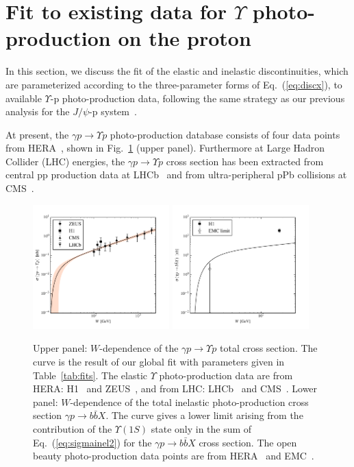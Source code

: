 \documentclass[prd,amsmath,%
twocolumn,floatfix,amssymb, preprintnumbers, linenumbers,nofootinbib, superscriptaddress]{revtex4}
\begin{document}
\section{Fit to existing data for $\Upsilon$ photo-production on the proton}


In this section, we discuss the fit of the elastic and inelastic discontinuities, which are parameterized according to the three-parameter forms of Eq.~(\ref{eq:discx}), to available  $\Upsilon$-p photo-production data, following the same strategy as our previous analysis for 
the $J/\psi$-p system~\cite{Gryniuk:2016mpk}. 
 
At present, the $\gamma p \to \Upsilon p$ photo-production database consists of four data points from HERA~\cite{Adloff:2000vm,Breitweg:1998ki,Chekanov:2009zz}, shown in Fig.~\ref{fig:sigmatot} 
(upper panel). 
Furthermore at Large Hadron Collider (LHC) energies, the $\gamma p \to \Upsilon p$ cross section has been extracted from central pp production data at LHCb~\cite{Aaij:2015kea} 
and from ultra-peripheral pPb collisions at  CMS~\cite{Sirunyan:2018sav}.

\begin{figure}
\includegraphics[width=0.47\textwidth]{si_y.pdf}
\includegraphics[width=0.47\textwidth]{si_bbX.pdf}
\caption{Upper panel: $W$-dependence of the $\gamma p \to \Upsilon p$ total cross section.
The curve is the result of our global fit with parameters given in Table~\ref{tab:fits}.
The elastic $\Upsilon$ photo-production data are from HERA: H1~\cite{Adloff:2000vm}
and ZEUS~\cite{Breitweg:1998ki, Chekanov:2009zz}, and from LHC: LHCb~\cite{Aaij:2015kea} 
and CMS~\cite{Sirunyan:2018sav}. 
Lower panel: $W$-dependence of the 
total inelastic photo-production cross section $\gamma p \to b \bar b X$.
The curve gives a lower limit arising from the contribution of the $\Upsilon(1S)$ state only in the sum of Eq.~(\ref{eq:sigmainel2}) for the $\gamma p \to b \bar b X$ cross section. 
The open beauty photo-production data points are from HERA~\cite{Adloff:1999nr} and EMC~\cite{Aubert:1981gx}.}
\label{fig:sigmatot}
\end{figure}
\end{document}
